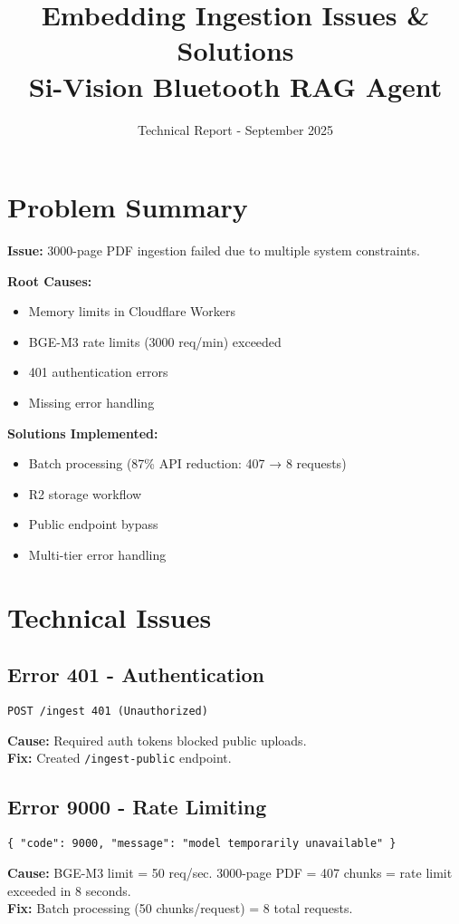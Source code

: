 \documentclass[11pt,a4paper]{article}
\title{\textbf{Embedding Ingestion Issues \& Solutions\\
Si-Vision Bluetooth RAG Agent}}
\author{Technical Report - September 2025}
\date{}
\begin{document}
\maketitle

\section{Problem Summary}

\textbf{Issue:} 3000-page PDF ingestion failed due to multiple system constraints.

\textbf{Root Causes:}
\begin{itemize}
    \item Memory limits in Cloudflare Workers
    \item BGE-M3 rate limits (3000 req/min) exceeded
    \item 401 authentication errors
    \item Missing error handling
\end{itemize}

\textbf{Solutions Implemented:}
\begin{itemize}
    \item Batch processing (87\% API reduction: 407 → 8 requests)
    \item R2 storage workflow
    \item Public endpoint bypass
    \item Multi-tier error handling
\end{itemize}

\section{Technical Issues}

\subsection{Error 401 - Authentication}
\begin{lstlisting}
POST /ingest 401 (Unauthorized)
\end{lstlisting}
\textbf{Cause:} Required auth tokens blocked public uploads.\\
\textbf{Fix:} Created \texttt{/ingest-public} endpoint.

\subsection{Error 9000 - Rate Limiting}
\begin{lstlisting}
{ "code": 9000, "message": "model temporarily unavailable" }
\end{lstlisting}
\textbf{Cause:} BGE-M3 limit = 50 req/sec. 3000-page PDF = 407 chunks = rate limit exceeded in 8 seconds.\\
\textbf{Fix:} Batch processing (50 chunks/request) = 8 total requests.
\end{document}
